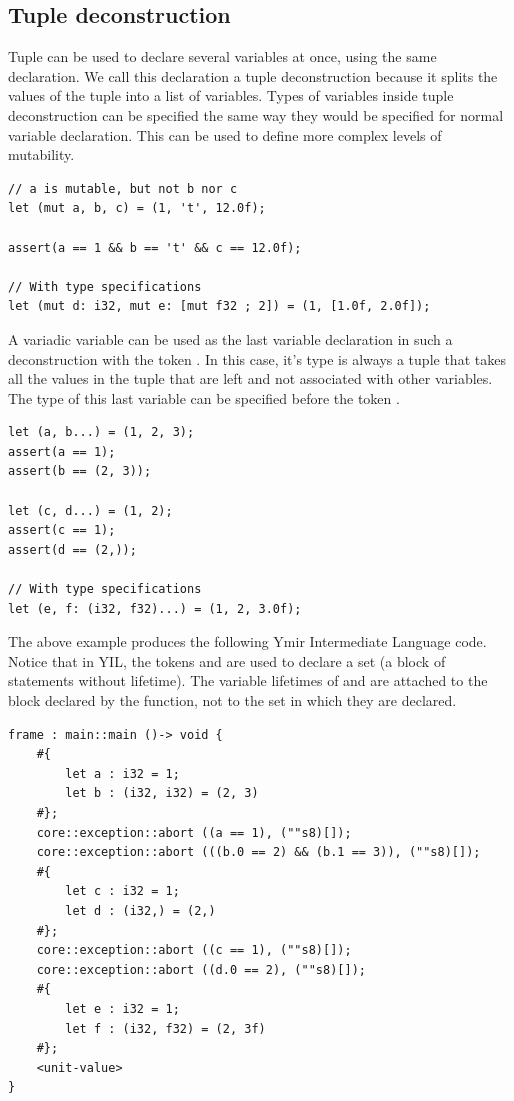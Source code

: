 \subsection {Tuple deconstruction}

Tuple can be used to declare several variables at once, using the same
 declaration. We call this declaration a tuple deconstruction
because it splits the values of the tuple into a list of variables. Types of
variables inside tuple deconstruction can be specified the same way they would
be specified for normal variable declaration. This can be used to define more
complex levels of mutability.

\begin{lstlisting}[style=coloredverbatim]
  // a is mutable, but not b nor c
let (mut a, b, c) = (1, 't', 12.0f);

assert(a == 1 && b == 't' && c == 12.0f);

// With type specifications
let (mut d: i32, mut e: [mut f32 ; 2]) = (1, [1.0f, 2.0f]);
\end{lstlisting}

A variadic variable can be used as the last variable declaration in such a
deconstruction with the token . In this case, it's type is always a
tuple that takes all the values in the tuple that are left and not associated
with other variables. The type of this last variable can be specified before the
token .

\begin{lstlisting}[style=coloredverbatim]
let (a, b...) = (1, 2, 3);
assert(a == 1);
assert(b == (2, 3));

let (c, d...) = (1, 2);
assert(c == 1);
assert(d == (2,));

// With type specifications
let (e, f: (i32, f32)...) = (1, 2, 3.0f);
\end{lstlisting}

The above example produces the following Ymir Intermediate Language code. Notice
that in YIL, the tokens \tokennolst{\#\{} and \tokennolst{\#\}} are used to declare a
set (a block of statements without lifetime). The variable lifetimes of 
and  are attached to the block declared by the function, not to the
set in which they are declared.

\begin{lstlisting}[style=myilVerb]
frame : main::main ()-> void {
    #{
        let a : i32 = 1;
        let b : (i32, i32) = (2, 3)
    #};
    core::exception::abort ((a == 1), (""s8)[]);
    core::exception::abort (((b.0 == 2) && (b.1 == 3)), (""s8)[]);
    #{
        let c : i32 = 1;
        let d : (i32,) = (2,)
    #};
    core::exception::abort ((c == 1), (""s8)[]);
    core::exception::abort ((d.0 == 2), (""s8)[]);
    #{
        let e : i32 = 1;
        let f : (i32, f32) = (2, 3f)
    #};
    <unit-value>
}
\end{lstlisting}

